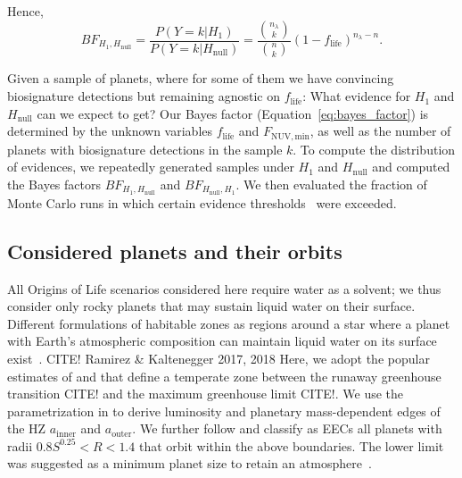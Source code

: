 \documentclass[modern,linenumbers]{aastex631}
\begin{document}
Hence,
\begin{equation}\label{eq:bayes_factor}
BF_{H_1,H_\mathrm{null}} = \frac{P(Y=k|H_1)}{P(Y=k|H_\mathrm{null})} = \frac{\binom{n_\lambda}{k}}{\binom{n}{k}}(1-f_\mathrm{life})^{n_{\lambda}-n}.
\end{equation}


Given a sample of planets, where for some of them we have convincing biosignature detections but remaining agnostic on $f_\mathrm{life}$: What evidence for $H_\mathrm{1}$ and $H_\mathrm{null}$ can we expect to get?
Our Bayes factor (Equation~\ref{eq:bayes_factor}) is determined by the unknown variables $f_\mathrm{life}$ and $F_\mathrm{NUV, min}$, as well as the number of planets with biosignature detections in the sample $k$.
To compute the distribution of evidences, we repeatedly generated samples under $H_\mathrm{1}$ and $H_\mathrm{null}$ and computed the Bayes factors $BF_{H_1,H_\mathrm{null}}$ and $BF_{H_\mathrm{null}, H_1}$.
We then evaluated the fraction of Monte Carlo runs in which certain evidence thresholds~\citep{Jeffreys1939} were exceeded.



\subsection{Considered planets and their orbits}
All Origins of Life scenarios considered here require water as a solvent; we thus consider only rocky planets that may sustain liquid water on their surface.
Different formulations of habitable zones as regions around a star where a planet with Earth's atmospheric composition can maintain liquid water on its surface exist~\citep[e.g.,][]{MolLous2022,Spinelli2023,Tuchow2023}. CITE! Ramirez \& Kaltenegger 2017, 2018
Here, we adopt the popular estimates of \citet{Kasting1993} and \citet{Kopparapu2013,Kopparapu2014} that define a temperate zone between the runaway greenhouse transition CITE! and the maximum greenhouse limit CITE!.
We use the parametrization in \citet{Kopparapu2014} to derive luminosity and planetary mass-dependent edges of the \gls{HZ} $a_\mathrm{inner}$ and $a_\mathrm{outer}$.
We further follow \citet{Bixel2021} and classify as \glspl{EEC} all planets with radii $0.8 S^{0.25} < R < 1.4 $ that orbit within the above boundaries.
The lower limit was suggested as a minimum planet size to retain an atmosphere~\citep{Zahnle2017}.
\end{document}
